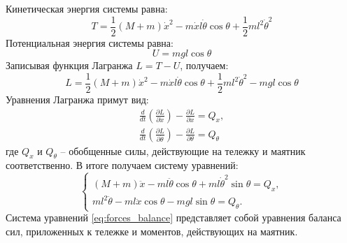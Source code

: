 Кинетическая энергия системы равна:
\begin{equation}
    T = \frac{1}{2} (M + m)\dot{x}^2 - m\dot{x}l\dot{\theta}\cos\theta + \frac{1}{2}ml^2\dot{\theta}^2
\end{equation}
Потенциальная энергия системы равна:
\begin{equation}
    U = mgl\cos\theta
\end{equation}
Записывая функция Лагранжа $L = T - U$, получаем: 
\begin{equation}
    L = \frac{1}{2} (M + m)\dot{x}^2 - m\dot{x}l\dot{\theta}\cos\theta + \frac{1}{2}ml^2\dot{\theta}^2 - mgl\cos\theta
\end{equation}
Уравнения Лагранжа примут вид:
\begin{equation}
    \begin{array}{cc}
        \frac{d}{dt} \left( \frac{\partial L}{\partial \dot{x}} \right) - \frac{\partial L}{\partial x} = Q_x, \\
        \frac{d}{dt} \left( \frac{\partial L}{\partial \dot{\theta}} \right) - \frac{\partial L}{\partial \theta} = Q_{\theta}
    \end{array}
\end{equation}
где $Q_x$ и $Q_{\theta}$ -- обобщенные силы, действующие на тележку и маятник соответственно. В итоге получаем систему уравнений:
\begin{equation}
    \begin{cases}
        (M + m)\ddot{x} - ml\ddot{\theta}\cos\theta + ml\dot{\theta}^2\sin\theta = Q_x, \\
        ml^2\ddot{\theta} - ml\ddot{x}\cos\theta - mgl\sin\theta = Q_{\theta}.
    \end{cases}
    \label{eq:forces_balance}
\end{equation}
Система уравнений \eqref{eq:forces_balance} представляет собой уравнения баланса сил, 
приложенных к тележке и моментов, действующих на маятник.

